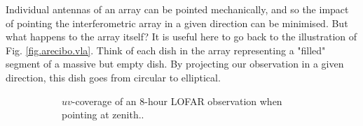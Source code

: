 \pg
Individual antennas of an array can be pointed mechanically, and so the impact of pointing the interferometric array in a given direction can be minimised. But what happens to the array itself? It is useful here to go back to the illustration of Fig. \ref{fig.arecibo.vla}. Think of each dish in the array representing a "filled" segment of a massive but empty dish. By projecting our observation in a given direction, this dish goes from circular to elliptical.
\begin{figure}[ht]
\centering
\begin{subfigure}{.40\textwidth}
\caption{\label{fig.lofar.uvcoverage.zenith} $uv$-coverage of an 8-hour LOFAR observation when pointing at zenith..}
\end{subfigure}
\hfill
\begin{subfigure}{.40\textwidth}

\end{subfigure}
\end{figure}
